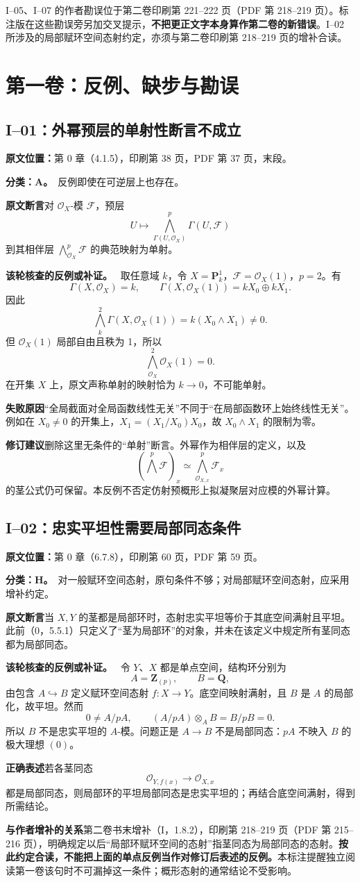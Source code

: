 \documentclass[UTF8,a4paper]{ctexbook}
\newcommand{\OO}{\mathscr O}
\newcommand{\FF}{\mathcal F}
\newcommand{\oldauditsrc}[1]{\par\noindent\textbf{原文位置：}#1。\par}
\newcommand{\kind}[2]{\noindent\textbf{分类：#1。}\ #2\par}
\newcommand{\lead}[1]{\par\noindent\textbf{#1}\quad}
\newenvironment{analysisproof}{\par\noindent\textbf{该轮核查的反例或补证。}\ }{\par}
\begin{document}
I--05、I--07 的作者勘误位于第二卷印刷第 221--222 页（PDF 第 218--219 页）。标注版在这些勘误旁另加交叉提示，\textbf{不把更正文字本身算作第二卷的新错误}。I--02 所涉及的局部赋环空间态射约定，亦须与第二卷印刷第 218--219 页的增补合读。

\chapter{第一卷：反例、缺步与勘误}
\section{I--01：外幂预层的单射性断言不成立}
\oldauditsrc{第 0 章（4.1.5），印刷第 38 页，PDF 第 37 页，末段}
\kind{A}{反例即使在可逆层上也存在。}
\lead{原文断言}对 $\OO_X$-模 $\FF$，预层
\[
 U\longmapsto\bigwedge_{\Gamma(U,\OO_X)}^p\Gamma(U,\FF)
\]
到其相伴层 $\bigwedge^p_{\OO_X}\FF$ 的典范映射为单射。
\begin{analysisproof}
取任意域 $k$，令 $X=\mathbf P^1_k$，$\FF=\OO_X(1)$，$p=2$。有
\[
\Gamma(X,\OO_X)=k,\qquad
\Gamma(X,\OO_X(1))=kX_0\oplus kX_1.
\]
因此
\[
\bigwedge_k^2\Gamma(X,\OO_X(1))=k(X_0\wedge X_1)\ne0.
\]
但 $\OO_X(1)$ 局部自由且秩为 1，所以
\[
\bigwedge_{\OO_X}^2\OO_X(1)=0.
\]
在开集 $X$ 上，原文声称单射的映射恰为 $k\to0$，不可能单射。
\end{analysisproof}
\lead{失败原因}“全局截面对全局函数线性无关”不同于“在局部函数环上始终线性无关”。例如在 $X_0\ne0$ 的开集上，$X_1=(X_1/X_0)X_0$，故 $X_0\wedge X_1$ 的限制为零。
\lead{修订建议}删除这里无条件的“单射”断言。外幂作为相伴层的定义，以及
\[
(\textstyle\bigwedge^p\FF)_x\simeq\bigwedge^p_{\OO_{X,x}}\FF_x
\]
的茎公式仍可保留。本反例不否定仿射预概形上拟凝聚层对应模的外幂计算。

\section{I--02：忠实平坦性需要局部同态条件}
\oldauditsrc{第 0 章（6.7.8），印刷第 60 页，PDF 第 59 页}
\kind{H}{对一般赋环空间态射，原句条件不够；对局部赋环空间态射，应采用增补约定。}
\lead{原文断言}当 $X,Y$ 的茎都是局部环时，态射忠实平坦等价于其底空间满射且平坦。此前（0，5.5.1）只定义了“茎为局部环”的对象，并未在该定义中规定所有茎同态都为局部同态。
\begin{analysisproof}
令 $Y$、$X$ 都是单点空间，结构环分别为
\[
A=\mathbf Z_{(p)},\qquad B=\mathbf Q,
\]
由包含 $A\hookrightarrow B$ 定义赋环空间态射 $f:X\to Y$。底空间映射满射，且 $B$ 是 $A$ 的局部化，故平坦。然而
\[
0\ne A/pA,\qquad (A/pA)\otimes_A B=B/pB=0.
\]
所以 $B$ 不是忠实平坦的 $A$-模。问题正是 $A\to B$ 不是局部同态：$pA$ 不映入 $B$ 的极大理想 $(0)$。
\end{analysisproof}
\lead{正确表述}若各茎同态
\[
\OO_{Y,f(x)}\longrightarrow\OO_{X,x}
\]
都是局部同态，则局部环的平坦局部同态是忠实平坦的；再结合底空间满射，得到所需结论。
\lead{与作者增补的关系}第二卷书末增补（I，1.8.2），印刷第 218--219 页（PDF 第 215--216 页），明确规定以后“局部环赋环空间的态射”指茎同态为局部同态的态射。\textbf{按此约定合读，不能把上面的单点反例当作对修订后表述的反例。}本标注提醒独立阅读第一卷该句时不可漏掉这一条件；概形态射的通常结论不受影响。
\end{document}
